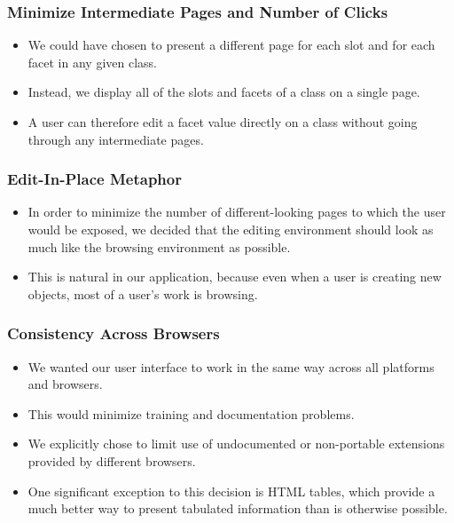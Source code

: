 \documentclass{beamer}
\begin{document}
\begin{frame}
\frametitle{Minimize Intermediate Pages and Number of Clicks}

\begin{itemize}
\item We could have chosen to present a different page for each slot and for each facet in any given class.
\item Instead, we display all of the slots and facets of a class on a single page.
\item A user can therefore edit a facet value directly on a class without going through any intermediate pages.
\end{itemize}

\end{frame}

\begin{frame}
\frametitle{Edit-In-Place Metaphor}

\begin{itemize}
\item In order to minimize the number of different-looking pages to which the user would be exposed, we decided that the editing environment should look as much like the browsing environment as possible.
\item This is natural in our application, because even when a user is creating new objects, most of a user's work is browsing.
\end{itemize}

\end{frame}

\begin{frame}
\frametitle{Consistency Across Browsers}

\begin{itemize}
\item We wanted our user interface to work in the same way across all platforms and browsers.
\item This would minimize training and documentation problems.
\item We explicitly chose to limit use of undocumented or non-portable extensions provided by different browsers.
\item One significant exception to this decision is HTML tables, which provide a much better way to present tabulated information than is otherwise possible.
\end{itemize}

\end{frame}
\end{document}
